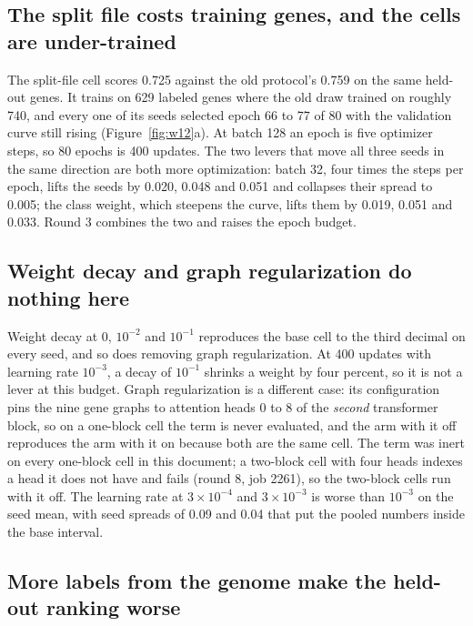 \subsection{The split file costs training genes, and the cells are under-trained}

The split-file cell scores 0.725 against the old protocol's 0.759 on the same held-out
genes. It trains on 629 labeled genes where the old draw trained on roughly 740, and every
one of its seeds selected epoch 66 to 77 of 80 with the validation curve still rising
(Figure~\ref{fig:w12}a). At batch 128 an epoch is five optimizer steps, so 80 epochs is 400
updates. The two levers that move all three seeds in the same direction are both more
optimization: batch 32, four times the steps per epoch, lifts the seeds by 0.020, 0.048 and
0.051 and collapses their spread to 0.005; the class weight, which steepens the curve,
lifts them by 0.019, 0.051 and 0.033. Round 3 combines the two and raises the epoch budget.

\subsection{Weight decay and graph regularization do nothing here}
\label{sec:backbone-knobs}

Weight decay at 0, $10^{-2}$ and $10^{-1}$ reproduces the base cell to the third decimal on
every seed, and so does removing graph regularization. At 400 updates with learning rate
$10^{-3}$, a decay of $10^{-1}$ shrinks a weight by four percent, so it is not a lever at
this budget. Graph regularization is a different case: its configuration pins the nine
gene graphs to attention heads 0 to 8 of the \emph{second} transformer block, so on a
one-block cell the term is never evaluated, and the arm with it off reproduces the arm
with it on because both are the same cell. The term was inert on every one-block cell in
this document; a two-block cell with four heads indexes a head it does not have and
fails (round 8, job 2261), so the two-block cells run with it off.
The learning rate at $3 \times 10^{-4}$ and $3 \times 10^{-3}$ is worse than $10^{-3}$ on
the seed mean, with seed spreads of 0.09 and 0.04 that put the pooled numbers inside the
base interval.

\subsection{More labels from the genome make the held-out ranking worse}

